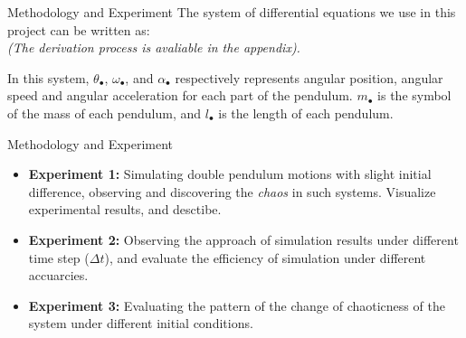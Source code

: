 \documentclass[aspectratio=169, 12pt]{beamer}
\begin{document}
\begin{frame}{Methodology and Experiment}
	\small The system of differential equations we use in this project can be written as:
	\\ \textit{(The derivation process is avaliable in the appendix).}


	\small In this system, $\theta_{\bullet}$, $\omega_{\bullet}$, and $\alpha_{\bullet}$ respectively represents angular position, angular speed and angular acceleration for each part of the pendulum. $m_{\bullet}$ is the symbol of the mass of each pendulum, and $l_{\bullet}$ is the length of each pendulum.
\end{frame}

\begin{frame}{Methodology and Experiment}
	\begin{itemize}
		\item \textbf{Experiment 1:} Simulating double pendulum motions with slight initial difference, observing and discovering the \textit{chaos} in such systems. Visualize experimental results, and desctibe.
		\item \textbf{Experiment 2:} Observing the approach of simulation results under different time step ($\Delta t$), and evaluate the efficiency of simulation under different accuarcies.
		\item \textbf{Experiment 3:} Evaluating the pattern of the change of chaoticness of the system under different initial conditions.
	\end{itemize}

\end{frame}
\end{document}
